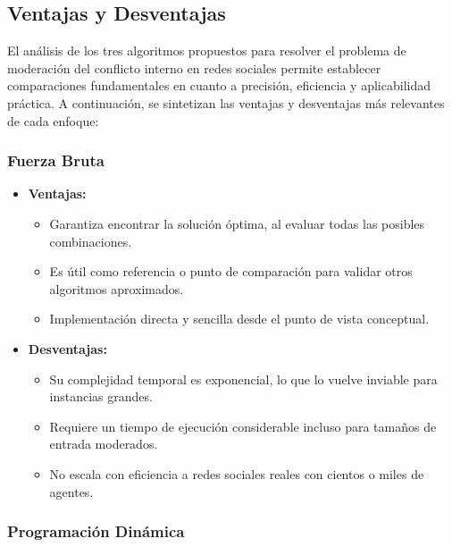 \documentclass[11pt,letter]{article}
\begin{document}
    \subsection{Ventajas y Desventajas}

    El análisis de los tres algoritmos propuestos para resolver el problema de moderación del conflicto interno en redes sociales permite establecer comparaciones fundamentales en cuanto a precisión, eficiencia y aplicabilidad práctica. A continuación, se sintetizan las ventajas y desventajas más relevantes de cada enfoque:

    \subsubsection{Fuerza Bruta}

    \begin{itemize}
        \item \textbf{Ventajas:}
        \begin{itemize}
            \item Garantiza encontrar la solución óptima, al evaluar todas las posibles combinaciones.
            \item Es útil como referencia o punto de comparación para validar otros algoritmos aproximados.
            \item Implementación directa y sencilla desde el punto de vista conceptual.
        \end{itemize}
        \item \textbf{Desventajas:}
        \begin{itemize}
            \item Su complejidad temporal es exponencial, lo que lo vuelve inviable para instancias grandes.
            \item Requiere un tiempo de ejecución considerable incluso para tamaños de entrada moderados.
            \item No escala con eficiencia a redes sociales reales con cientos o miles de agentes.
        \end{itemize}
    \end{itemize}

    \subsubsection{Programación Dinámica}
\end{document}
